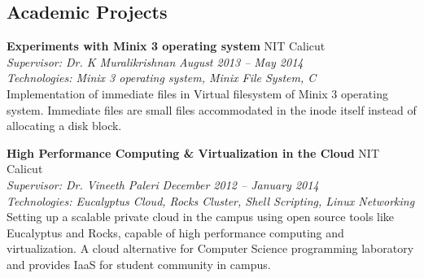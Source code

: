 \documentclass[margin,line]{resume}
\begin{document}
\begin{resume}
	 
 \vspace{3mm}


    \section{\mysidestyle Academic Projects}

   
	
	
    \textbf{Experiments with Minix 3 operating system } 				\hfill NIT Calicut \\
      \textit{Supervisor: Dr. K Muralikrishnan } 			\hfill \textit{August 2013 -- May 2014}\\
      \textit{Technologies: Minix 3 operating system, Minix File System, C }\\
    Implementation of immediate files in Virtual filesystem of Minix 3 operating system. Immediate files are small files accommodated in the inode itself instead of allocating a disk block. 

    \textbf{High Performance Computing \& Virtualization in the Cloud} 				\hfill NIT Calicut \\
      \textit{Supervisor: Dr. Vineeth Paleri } 			\hfill \textit{December 2012 -- January 2014}\\
      \textit{Technologies: Eucalyptus Cloud, Rocks Cluster, Shell Scripting, Linux Networking}\\
    Setting up a scalable private cloud in the campus using open source tools like Eucalyptus and Rocks,
capable of high performance computing and virtualization.  A cloud alternative for Computer Science
programming laboratory and provides IaaS for student community in campus.
	\vspace{2mm}%
%
%   
%   
%   
%    
      

\end{resume}
\end{document}
